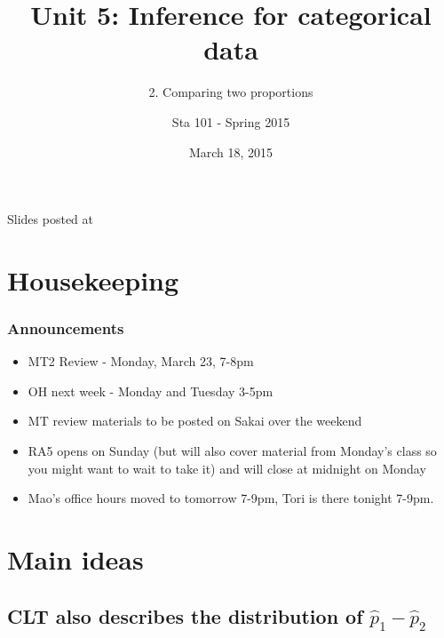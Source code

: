 \documentclass[11pt,containsverbatim,handout,xcolor=xelatex,dvipsnames,table]{beamer}
\title{Unit 5: Inference for categorical data}
\subtitle{2. Comparing two proportions}
\author{Sta 101 - Spring 2015}
\date{March 18, 2015}
\institute{Duke University, Department of Statistical Science}
\begin{document}


\begin{frame}[plain]

\titlepage
\vfill
{\scriptsize {} \hfill Slides posted at  \webLink{\CourseSite}{\CourseSite}}
\addtocounter{framenumber}{-1} 

\end{frame}


\section{Housekeeping}


\begin{frame}
\frametitle{Announcements}

\begin{itemize}

\item MT2 Review - Monday, March 23, 7-8pm

\item OH next week - Monday and Tuesday 3-5pm

\item MT review materials to be posted on Sakai over the weekend

\item RA5 opens on Sunday (but will also cover material from Monday's class so you might want to wait to take it) and will close at midnight on Monday

\item Mao's office hours moved to tomorrow 7-9pm, Tori is there tonight 7-9pm.

\end{itemize}

\end{frame}


\section{Main ideas}


\subsection{CLT also describes the distribution of $\hat{p}_1 - \hat{p}_2$}
\label{mi1}
\end{document}

